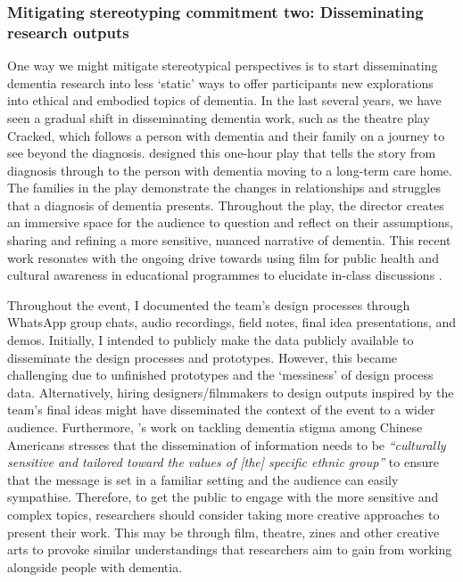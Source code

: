 \subsubsection{Mitigating stereotyping commitment two: Disseminating research outputs}
\label{DiscussionOne:CommitmentThree}
One way we might mitigate stereotypical perspectives is to start disseminating dementia research into less `static' ways to offer participants new explorations into ethical and embodied topics of dementia. In the last several years, we have seen a gradual shift in disseminating dementia work, such as the theatre play Cracked, which follows a person with dementia and their family on a journey to see beyond the diagnosis. \cite{kontos_raising_2018}  designed this one-hour play that tells the story from diagnosis through to the person with dementia moving to a long-term care home. The families in the play demonstrate the changes in relationships and struggles that a diagnosis of dementia presents. Throughout the play, the director creates an immersive space for the audience to question and reflect on their assumptions, sharing and refining a more sensitive, nuanced narrative of dementia. This recent work resonates with the ongoing drive towards using film for public health and cultural awareness in educational programmes to elucidate in-class discussions \citep{botchway2017films}. 

Throughout the event, I documented the team's design processes through WhatsApp group chats, audio recordings, field notes, final idea presentations, and demos. Initially, I intended to publicly make the data publicly available to disseminate the design processes and prototypes. However, this became challenging due to unfinished prototypes and the `messiness' of design process data. Alternatively, hiring designers/filmmakers to design outputs inspired by the team’s final ideas might have disseminated the context of the event to a wider audience. Furthermore, \citeauthor{zheng2016exploring}'s \citeyear{zheng2016exploring} work on tackling dementia stigma among Chinese Americans stresses that the dissemination of information needs to be \textit{``culturally sensitive and tailored toward the values of [the] specific ethnic group''} to ensure that the message is set in a familiar setting and the audience can easily sympathise. Therefore, to get the public to engage with the more sensitive and complex topics, researchers should consider taking more creative approaches to present their work. This may be through film, theatre, zines and other creative arts to provoke similar understandings that researchers aim to gain from working alongside people with dementia.

